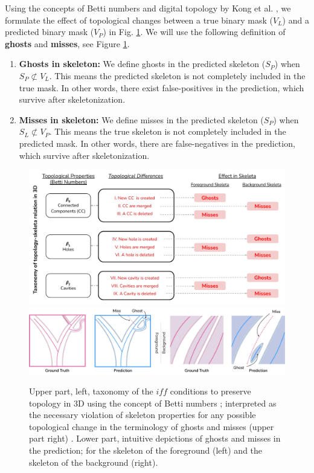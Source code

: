 Using the concepts of Betti numbers and digital topology by Kong et al. \cite{kong1995topology,rosenfeld1979digital}, we formulate the effect of topological changes between a true binary mask ($V_L$) and a predicted binary mask ($V_P$) in Fig. \ref{fig_ghost_miss}. We will use the following definition of \textbf{ghosts} and \textbf{misses}, see Figure \ref{fig_ghost_miss}.


\begin{enumerate}[] %
    \item \textbf{Ghosts in skeleton: } We define ghosts in the predicted skeleton ($S_P$) when $S_P \not\subset V_L$. This means the predicted skeleton is not completely included in the true mask. In other words, there exist false-positives in the prediction, which survive after skeletonization.\label{prop1}
    
    \item \textbf{Misses in skeleton: } We define misses in the predicted skeleton ($S_P$) when $S_L \not\subset V_P$. This means the true skeleton is not completely included in the predicted mask. In other words, there are false-negatives in the prediction, which survive after skeletonization.\label{prop2}
\end{enumerate}



\begin{figure}[ht!]
\begin{center}

\includegraphics[width=0.95\linewidth]{figs/clDice_CVPR.pdf}
\label{fig_theory}
\includegraphics[width=0.92\linewidth]{figs/ghost_miss_cvpr.png}
\end{center}
\caption{Upper part, left, taxonomy of the $iff$ conditions to preserve topology in 3D using the concept of Betti numbers \cite{kong1995topology,kong1989digital}; interpreted as the necessary violation of skeleton properties for any possible topological change in the terminology of ghosts and misses (upper part right) . Lower part, intuitive depictions of ghosts and misses in the prediction; for the skeleton of the foreground (left) and the skeleton of the background (right).}
\label{fig_ghost_miss}
\end{figure}

